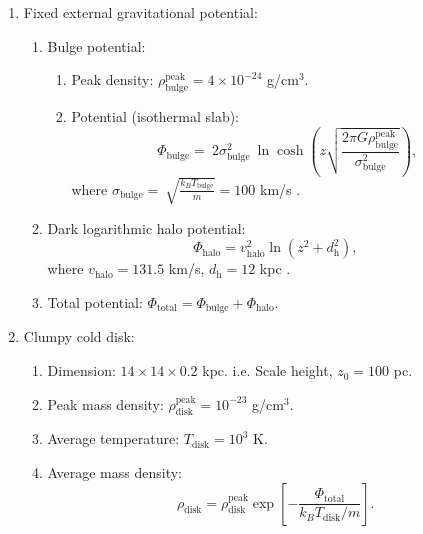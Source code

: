 \documentclass[twocolumn]{aastex631}
\begin{document}
\begin{enumerate}
\item Fixed external gravitational potential:
  \begin{enumerate}
    \item Bulge potential:
      \begin{enumerate}
       \item Peak density: $\rho_{\text{bulge}}^{\text{peak}}=4\times 10^{-24}$ g/cm$^3$.
       \item Potential (isothermal slab):
         \begin{equation}
           \Phi_{\text{bulge}}=\
           2\sigma^2_{\text{bulge}}\
           \ln\cosh\left(z\sqrt{\frac{2\pi G\rho_{\text{bulge}}^{\text{peak}}}{\sigma^2_{\text{bulge}}}}\right),
         \end{equation}
          where $\displaystyle \sigma_{\text{bulge}}=\
                \sqrt{\frac{k_{B}T_{\text{bulge}}}{m}}=100$ km/s \citep{velocity-dispersion-MW}.
      \end{enumerate}

    \item Dark logarithmic halo potential:
         \begin{equation}
           \Phi_{\text{halo}}=v^2_{\text{halo}}\ln\left(z^2+d^2_{\text{h}}\right),
         \end{equation}
         where $v_{\text{halo}}=131.5$ km/s, $d_{\text{h}}=12$ kpc \citep{Yang2013}.

    \item Total potential: $\Phi_{\text{total}}=\Phi_{\text{bulge}}+\Phi_{\text{halo}}$.
  \end{enumerate}


\item Clumpy cold disk:
  \begin{enumerate}
    \item Dimension: $14\times14\times0.2$ kpc. i.e. Scale height, $z_{0}=100$ pc. \citep{peak-ism-density}
    \item Peak mass density: $\rho_{\text{disk}}^{\text{peak}}=10^{-23}$ g/cm$^3$. \citep{peak-ism-density}
    \item Average temperature: $T_{\text{disk}}=10^{3}$ K. \citep{peak-ism-density}
    \item Average mass density:
          \begin{equation}
             \rho_{\text{disk}}=\rho_{\text{disk}}^{\text{peak}}
             \exp\left[-\frac{\Phi_{\text{total}}}{k_{B}T_{\text{disk}}/m}\right].
             \label{disk-density}
          \end{equation}


\end{enumerate}
\end{enumerate}
\end{document}

